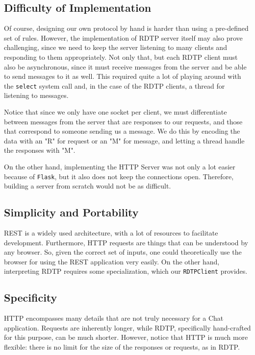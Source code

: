 \documentclass[10pt]{article}
\begin{document}
\subsection{Difficulty of Implementation}

Of course, designing our own protocol by hand is harder than using a pre-defined set of
rules. However, the implementation of RDTP server itself may also prove challenging, since
we need to keep the server listening to many clients and responding to them appropriately.
Not only that, but each RDTP client must also be asynchronous, since it must receive messages
from the server and be able to send messages to it as well. This required quite a lot of
playing around with the \verb|select| system call and, in the case of the RDTP clients,
a thread for listening to messages. 

\medskip

Notice that since we only have one socket per client, we must differentiate between messages
from the server that are responses to our requests, and those that correspond to someone
sending us a message. We do this by encoding the data with an "R" for request or an "M" for
message, and letting a thread handle the responses with "M".

\medskip

On the other hand, implementing the HTTP Server was not only a lot easier because of \verb|Flask|,
but it also does not keep the connections open. Therefore, building a server from scratch would not
be as difficult.

\subsection{Simplicity and Portability}

REST is a widely used architecture, with a lot of resources to facilitate development. Furthermore,
HTTP requests are things that can be understood by any browser. So, given the correct set of inputs,
one could theoretically use the browser for using the REST application very easily. On the other hand,
interpreting RDTP requires some specialization, which our \verb|RDTPClient| provides.

\subsection{Specificity}

HTTP encompasses many details that are not truly necessary for a Chat application.
Requests are inherently longer, while RDTP, specifically hand-crafted for this purpose, can be much
shorter. However, notice that HTTP is much more flexible: there is no limit for the size of the
responses or requests, as in RDTP.
\end{document}
